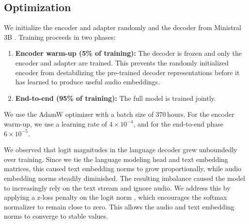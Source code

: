 \subsection{Optimization}

We initialize the encoder and adapter randomly and the decoder from Ministral 3B \citep{liu2026ministral3}. Training proceeds in two phases:

\begin{enumerate}
    \item \textbf{Encoder warm-up (5\% of training):} The decoder is frozen and only the encoder and adapter are trained. This prevents the randomly initialized encoder from destabilizing the pre-trained decoder representations before it has learned to produce useful audio embeddings.
    \item \textbf{End-to-end (95\% of training):} The full model is trained jointly.
\end{enumerate}

We use the AdamW optimizer \citep{loshchilov2019adamw} with a batch size of 370\,hours. For the encoder warm-up, we use a learning rate of $4 \times 10^{-4}$, and for the end-to-end phase $6 \times 10^{-5}$.

We observed that logit magnitudes in the language decoder grew unboundedly over training. Since we tie the language modeling head and text embedding matrices, this caused text embedding norms to grow proportionally, while audio embedding norms steadily diminished. The resulting imbalance caused the model to increasingly rely on the text stream and ignore audio. We address this by applying a z-loss penalty on the logit norm \citep{debrébisson2016zloss,chowdhery2022palm}, which encourages the softmax normalizer to remain close to zero. This allows the audio and text embedding norms to converge to stable values.
